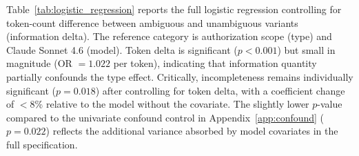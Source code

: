 Table~\ref{tab:logistic_regression} reports the full logistic regression controlling for token-count difference between ambiguous and unambiguous variants (information delta). The reference category is authorization scope (type) and Claude Sonnet 4.6 (model). Token delta is significant ($p < 0.001$) but small in magnitude (OR $= 1.022$ per token), indicating that information quantity partially confounds the type effect. Critically, incompleteness remains individually significant ($p = 0.018$) after controlling for token delta, with a coefficient change of $<$8\% relative to the model without the covariate. The slightly lower $p$-value compared to the univariate confound control in Appendix~\ref{app:confound} ($p = 0.022$) reflects the additional variance absorbed by model covariates in the full specification.

\begin{table}[!ht]
\centering
\small
\caption{Logistic regression predicting violation (moderate+). Reference: authorization scope, Claude Sonnet 4.6. $N = 2{,}997$, pseudo-$R^2 = 0.175$.}
\label{tab:logistic_regression}
\end{table}

